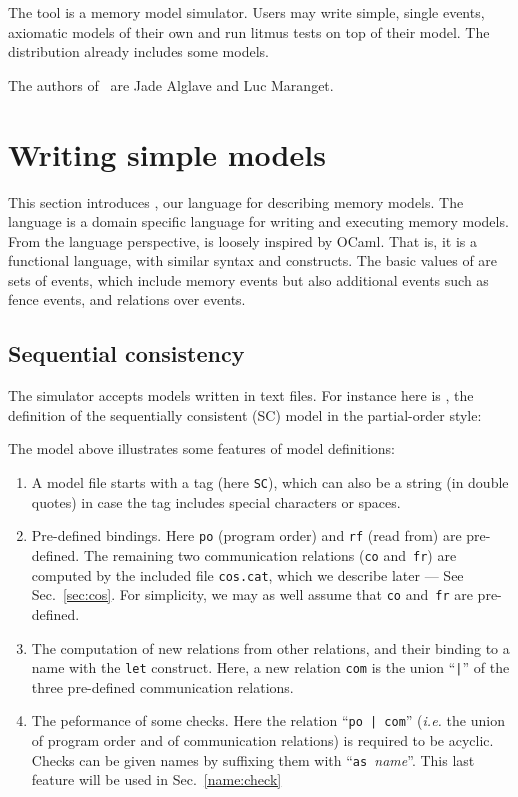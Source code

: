 
The tool \herd{} is a memory model simulator.
Users may write simple, single events,
axiomatic models of their own and run litmus tests on top
of their model.
The \herd{} distribution already includes some models.

The authors of~\herd{} are Jade Alglave and Luc Maranget.


\section{Writing simple models}
This section introduces \cat{}, our language for describing memory models.
The \cat{} language is a domain specific language for writing and executing
memory models. From the language perspective, \cat{} is loosely inspired
by OCaml. That is, it is a functional language, with similar syntax
and constructs.
The basic values of \cat{} are sets of events, which include memory events
but also additional events such as fence events,
and relations over events.


\subsection{Sequential consistency}
The simulator \herd{} accepts models written in text files.
For instance here is ,
the definition of the sequentially consistent (SC) model in the partial-order
style:

The model above illustrates some features of model definitions:
\begin{enumerate}
\item A model file starts with a tag (here \verb+SC+), which can also be a
string (in double quotes) in case the tag includes special characters or spaces.
\item Pre-defined bindings. Here \verb+po+ (program order)
and \texttt{rf} (read from) are pre-defined.
The remaining two communication relations (\texttt{co} and~\texttt{fr})
are computed by the included file \verb+cos.cat+, which we describe later
--- See Sec.~\ref{sec:cos}.
For simplicity, we may as well assume that \verb+co+
and~\verb+fr+ are pre-defined.
\item The computation of new relations from other relations,
and their binding to a name with the \verb+let+ construct.
Here, a new relation \verb+com+ is the union ``\texttt{|}'' of
the three pre-defined communication relations.
\item The peformance of some checks. Here the relation ``\verb+po | com+''
(\emph{i.e.} the union of program order  and of  communication
relations) is required to be acyclic.
Checks can be given names by suffixing them with
``\texttt{as~}\textit{name}''.
This last feature will be used in Sec.~\ref{name:check}
\end{enumerate}

